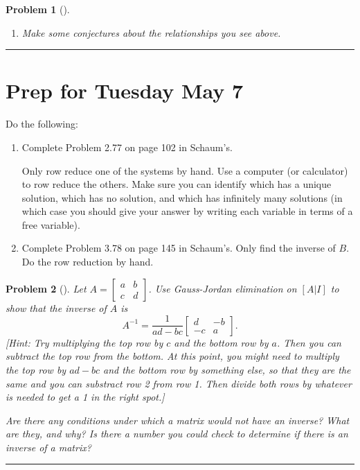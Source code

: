 \documentclass[letterpaper,oneside]{book}%
\theoremstyle{plain}
\theoremstyle{box}
\theoremstyle{problem}
\newtheorem{problemnum}{Problem}[chapter]
\newtheorem*{hwenum*}{Home Work Practice}
\newenvironment{problem}[1][]{\begin{problemnum}[#1]}{\end{problemnum}\nopagebreak\hrule\bigskip}
\newenvironment{hw*}[1][]{\begin{hwenum*}[#1]}{\end{hwenum*}\nopagebreak\hrule\bigskip}
\begin{document}
\begin{problem}
\begin{enumerate}
\item Make some conjectures about the relationships you see above. 

\end{enumerate}



\end{problem}




\section{Prep for Tuesday May 7}

\begin{hw*}Do the following:
\begin{enumerate}
 \item 
 Complete Problem 2.77 on page 102 in Schaum's. 

Only row reduce one of the systems by hand.  Use a computer (or calculator) to row reduce the others. Make sure you can identify which has a unique solution, which has no solution, and which has infinitely many solutions (in which case you should give your answer by writing each variable in terms of a free variable).

\item  Complete Problem 3.78 on page 145 in Schaum's. Only find the inverse of $B$. Do the row reduction by hand. 
\end{enumerate}
\end{hw*}


\begin{problem}
Let $A=\begin{bmatrix}a&b\\c&d\end{bmatrix}$. Use Gauss-Jordan elimination on $[A | I]$ to show that the inverse of $A$ is 
$$A^{-1}=\frac{1}{ad-bc}\begin{bmatrix}d&-b\\-c&a\end{bmatrix}.$$
[Hint: Try multiplying the top row by $c$ and the bottom row by $a$.  Then you can subtract the top row from the bottom.  At this point, you might need to multiply the top row by $ad-bc$ and the bottom row by something else, so that they are the same and you can substract row 2 from row 1.  Then divide both rows by whatever is needed to get a 1 in the right spot.]

Are there any conditions under which a matrix would not have an inverse?  What are they, and why? Is there a number you could check to determine if there is an inverse of a matrix?
\end{problem}
\end{document}
